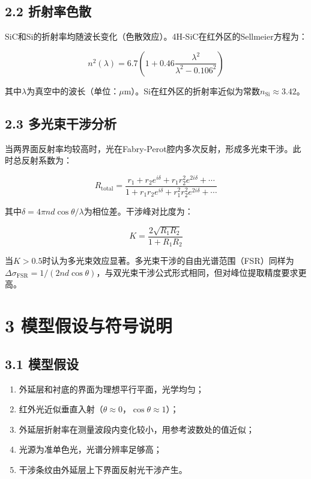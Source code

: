 \documentclass[12pt,a4paper]{article}
\begin{document}
\subsection{2.2 折射率色散}
SiC和Si的折射率均随波长变化（色散效应）。4H-SiC在红外区的Sellmeier方程为：

\begin{equation}
n^2(\lambda) = 6.7\left(1 + 0.46\frac{\lambda^2}{\lambda^2 - 0.106^2}\right)
\end{equation}

其中$\lambda$为真空中的波长（单位：$\mu$m）。Si在红外区的折射率近似为常数$n_{\text{Si}}\approx 3.42$。

\subsection{2.3 多光束干涉分析}
当两界面反射率均较高时，光在Fabry-Perot腔内多次反射，形成多光束干涉。此时总反射系数为：

\begin{equation}
R_{\text{total}} = \frac{r_1 + r_2 e^{i\delta} + r_1 r_2^2 e^{2i\delta} + \cdots}{1 + r_1 r_2 e^{i\delta} + r_1^2 r_2^2 e^{2i\delta} + \cdots}
\end{equation}

其中$\delta = 4\pi n d \cos\theta/\lambda$为相位差。干涉峰对比度为：

\begin{equation}
K = \frac{2\sqrt{R_1 R_2}}{1 + R_1 R_2}
\end{equation}

当$K > 0.5$时认为多光束效应显著。多光束干涉的自由光谱范围（FSR）同样为$\Delta\sigma_{\text{FSR}} = 1/(2nd\cos\theta)$，与双光束干涉公式形式相同，但对峰位提取精度要求更高。

\section{3 模型假设与符号说明}

\subsection{3.1 模型假设}
\begin{enumerate}
\item 外延层和衬底的界面为理想平行平面，光学均匀；
\item 红外光近似垂直入射（$\theta \approx 0$，$\cos\theta \approx 1$）；
\item 外延层折射率在测量波段内变化较小，用参考波数处的值近似；
\item 光源为准单色光，光谱分辨率足够高；
\item 干涉条纹由外延层上下界面反射光干涉产生。
\end{enumerate}
\end{document}
